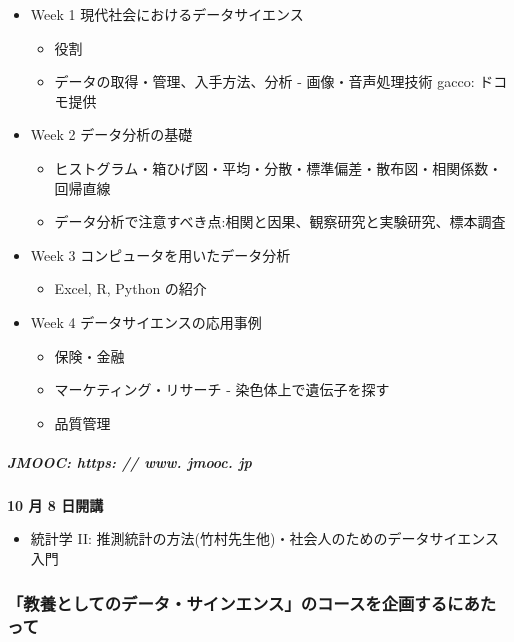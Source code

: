 \documentclass[
]{bxjsbook}
\providecommand{\tightlist}{%
  \setlength{\itemsep}{0pt}\setlength{\parskip}{0pt}}
\theoremstyle{definition}
\theoremstyle{definition}
\theoremstyle{definition}
\theoremstyle{definition}
\theoremstyle{remark}
\begin{document}
\begin{itemize}
\tightlist
\item
  Week 1 現代社会におけるデータサイエンス

  \begin{itemize}
  \tightlist
  \item
    役割
  \item
    データの取得・管理、入手方法、分析 - 画像・音声処理技術
    gacco: ドコモ提供
  \end{itemize}
\item
  Week 2 データ分析の基礎

  \begin{itemize}
  \tightlist
  \item
    ヒストグラム・箱ひげ図・平均・分散・標準偏差・散布図・相関係数・回帰直線
  \item
    データ分析で注意すべき点:相関と因果、観察研究と実験研究、標本調査
  \end{itemize}
\item
  Week 3 コンピュータを用いたデータ分析

  \begin{itemize}
  \tightlist
  \item
    Excel, R, Python の紹介
  \end{itemize}
\item
  Week 4 データサイエンスの応用事例

  \begin{itemize}
  \tightlist
  \item
    保険・金融
  \item
    マーケティング・リサーチ - 染色体上で遺伝子を探す
  \item
    品質管理
  \end{itemize}
\end{itemize}

\hypertarget{jmooc-https-www.-jmooc.-jp}{%
\subparagraph{JMOOC: https: // www. jmooc. jp}\label{jmooc-https-www.-jmooc.-jp}}

\textbf{10 月 8 日開講}

\begin{itemize}
\tightlist
\item
  統計学 II: 推測統計の方法(竹村先生他)・社会人のためのデータサイエンス入門
\end{itemize}

\hypertarget{ux6559ux990aux3068ux3057ux3066ux306eux30c7ux30fcux30bfux30b5ux30a4ux30f3ux30a8ux30f3ux30b9ux306eux30b3ux30fcux30b9ux3092ux4f01ux753bux3059ux308bux306bux3042ux305fux3063ux3066}{%
\subsubsection{「教養としてのデータ・サインエンス」のコースを企画するにあたって}\label{ux6559ux990aux3068ux3057ux3066ux306eux30c7ux30fcux30bfux30b5ux30a4ux30f3ux30a8ux30f3ux30b9ux306eux30b3ux30fcux30b9ux3092ux4f01ux753bux3059ux308bux306bux3042ux305fux3063ux3066}}
\end{document}
